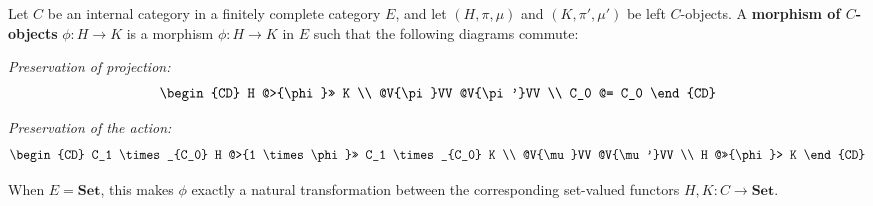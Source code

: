 Let $C$ be an internal category in a finitely complete category $E$, and let $(H, \pi, \mu)$ and $(K, \pi', \mu')$ be left $C$-objects. A \textbf{morphism of $C$-objects} $\phi : H \to K$ is a morphism $\phi : H \to K$ in $E$ such that the following diagrams commute:

\textit{Preservation of projection:}
$$
\begin{CD}
H @>{\phi}>> K \\
@V{\pi}VV @V{\pi'}VV \\
C_0 @= C_0
\end{CD}
$$

\textit{Preservation of the action:}
$$
\begin{CD}
C_1 \times_{C_0} H @>{1 \times \phi}>> C_1 \times_{C_0} K \\
@V{\mu}VV @V{\mu'}VV \\
H @>>{\phi}> K
\end{CD}
$$

When $E = \mathbf{Set}$, this makes $\phi$ exactly a natural transformation between the corresponding set-valued functors $H, K : C \to \mathbf{Set}$.
